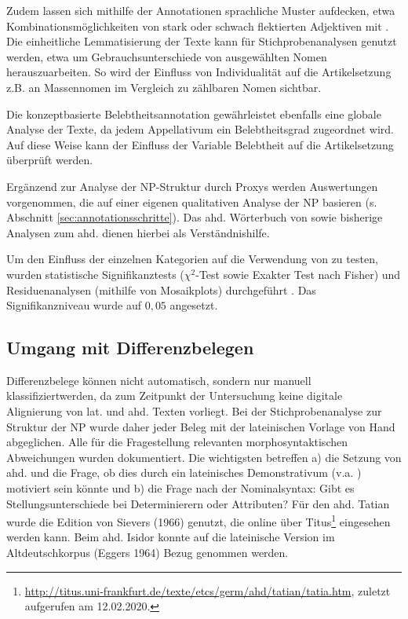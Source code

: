Zudem lassen sich mithilfe der Annotationen sprachliche Muster aufdecken, etwa Kombinationsmöglichkeiten von stark oder schwach flektierten Adjektiven mit . Die einheitliche Lemmatisierung der Texte kann für Stichprobenanalysen genutzt werden, etwa um Gebrauchsunterschiede  von ausgewählten Nomen herauszuarbeiten. So wird der Einfluss von Individualität auf die Artikelsetzung z.B. an Massennomen im Vergleich zu zählbaren Nomen sichtbar.

Die konzeptbasierte Belebtheitsannotation gewährleistet ebenfalls eine globale Analyse der Texte, da jedem Appellativum ein Belebtheitsgrad zugeordnet wird. Auf diese Weise kann der Einfluss der Variable Belebtheit auf die Artikelsetzung überprüft werden. 

Ergänzend zur Analyse der NP-Struktur durch Proxys werden Auswertungen vorgenommen, die auf einer eigenen qualitativen Analyse der NP basieren (s. Abschnitt \ref{sec:annotationsschritte}). Das ahd. Wörterbuch von \textcite{Schutzeichel2012} sowie bisherige Analysen zum ahd.  \parencite[v.a.][]{Oubouzar1989} dienen hierbei als Verständnishilfe.  

Um den Einfluss der einzelnen Kategorien auf die Verwendung von  zu testen, wurden statistische Signifikanztests ($\chi^2$-Test sowie Exakter Test nach Fisher) und Residuenanalysen (mithilfe von Mosaikplots) durchgeführt \parencite{Gries2013}. Das Signifikanzniveau wurde auf $0,05$ angesetzt.

\subsection{Umgang mit Differenzbelegen}\label{sec:differenz}

Differenzbelege können nicht automatisch, sondern nur manuell klassifiziert\linebreak werden, da zum Zeitpunkt der Untersuchung keine digitale Alignierung von lat. und ahd. Texten vorliegt. Bei der Stichprobenanalyse zur Struktur der NP wurde daher jeder Beleg mit der lateinischen Vorlage von Hand abgeglichen. Alle für die Fragestellung relevanten morphosyntaktischen Abweichungen wurden dokumentiert. Die wichtigsten betreffen a) die Setzung von ahd.  und die Frage, ob dies durch ein lateinisches Demonstrativum (v.a. ) motiviert sein könnte und b) die Frage nach der Nominalsyntax: Gibt es Stellungsunterschiede bei Determinierern oder Attributen? Für den ahd. Tatian wurde die Edition von Sievers (1966) genutzt, die online über Titus\footnote{\url{http://titus.uni-frankfurt.de/texte/etcs/germ/ahd/tatian/tatia.htm}, zuletzt aufgerufen am 12.02.2020.} eingesehen werden kann. Beim ahd. Isidor konnte auf die lateinische Version im Altdeutschkorpus (Eggers 1964) Bezug genommen werden.  


